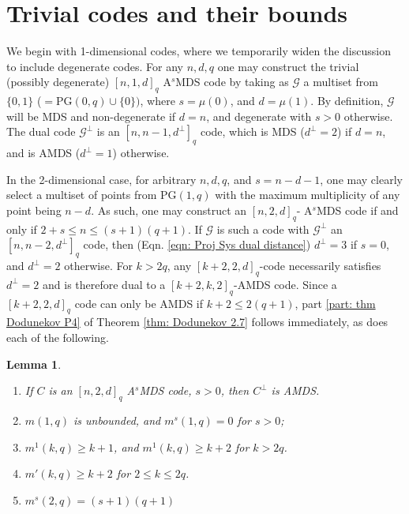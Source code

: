 \documentclass[11pt,a4paper]{amsart}
\newcommand{\AS}{ A$^s$MDS }
\newcommand{\G}{\mathcal{G}}
\theoremstyle{plain}
\newtheorem{lemma}[theorem]{Lemma}
\theoremstyle{definition}
\theoremstyle{remark}
\begin{document}
	\section{Trivial codes and their bounds} \label{sec: trivial codes}
	We begin with 1-dimensional codes, where we temporarily widen the discussion to include degenerate codes. For any $n,d,q$ one may construct the trivial (possibly degenerate) $[n,1,d]_q$ \AS code by taking as $\G$ a multiset from  $\{0,1\}$ ($=$PG$(0,q) \cup\{0\})$, where $s=\mu(0)$, and $d=\mu(1)$. By definition, $\G$  will be MDS and non-degenerate if $d=n$, and degenerate with $s>0$ otherwise. The dual code $\G^\perp$ is an $[n,n-1,d^\perp]_q$ code, which is MDS ($d^\perp = 2$) if $d=n$, and is AMDS ($d^\perp = 1$) otherwise.

	In the 2-dimensional case, for arbitrary $n,d,q$, and $s=n-d-1$, one may clearly select a multiset of points from PG$(1,q)$ with the maximum multiplicity of any point being $n-d$.  As such, one may construct an $[n,2,d]_q$-\AS code if and only if $2+s\le n\le (s+1)(q+1)$. If $\G$ is such a code with $\G^\perp$ an $[n,n-2,d^\perp]_q$ code, then (Eqn. \ref{eqn: Proj Sys dual distance}) $d^\perp =3$ if $s=0$, and $d^\perp=2$ otherwise. For $k>2q$,  any $[k+2,2,d]_q$-code  necessarily satisfies $d^\perp =2 $ and is therefore dual to a $[k+2,k,2]_q$-AMDS code.
	Since a $[k+2,2,d]_q$ code can only be AMDS if $k+2\le 2(q+1)$, part \ref{part: thm Dodunekov P4} of Theorem  \ref{thm: Dodunekov 2.7} follows immediately, as does each of the following.

	\begin{lemma} \label{lem: trivial bounds} \leavevmode \vspace*{-2mm}
		\begin{enumerate}
			\item If $C$ is an $[n,2,d]_q$ \AS code, $s>0$, then $C^\perp$ is AMDS. \label{part 1 lem: trivial bounds}
			\item $m(1,q)$ is unbounded, and $m^s(1,q)=0$ for $s>0$; \label{part 2 lem: trivial bounds}
			\item $m^1(k,q)\ge k+1$, and $m^1(k,q)\ge k+2$ for $k>2q$. \label{part 3 lem: trivial bounds}
			\item $m'(k,q)\ge k+2$ for $2\le k \le 2q$. \label{part 4 lem: trivial bounds}
			\item $m^s(2,q)=(s+1)(q+1)$ \label{part 5 lem: trivial bounds}
		\end{enumerate}
	\end{lemma}
\end{document}
